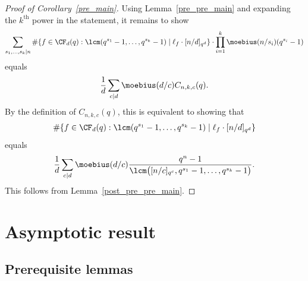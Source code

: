 \begin{proof}[Proof of Corollary~\ref{pre_main}]
Using Lemma~\ref{pre_pre_main} and expanding the \(k^\text{th}\) power in the statement, it remains to show
\[
\sum_{s_1,\ldots,s_k \mid n}
\# \{f \in \CF_d (q) : \lcm(q^{s_1}-1,\ldots,q^{s_k}-1) \mid \ell_f \cdot [n/d]_{q^d}\}
\cdot
\prod_{i=1}^k \moebius(n/s_i)(q^{s_i}-1)
\]
equals
\[
\frac{1}{d} \sum_{c \mid d} \moebius(d/c) C_{n,k,c} (q).
\]
By the definition of \(C_{n,k,c} (q)\),
this is equivalent to showing that
\[
\# \{f \in \CF_d (q) : \lcm(q^{s_1}-1,\ldots,q^{s_k}-1) \mid \ell_f \cdot [n/d]_{q^d} \}
\]
equals
\[
\frac{1}{d}
\sum_{c \mid d}
\moebius(d/c)
\frac{q^n-1}{\lcm \big ( [n/c]_{q^c}, q^{s_1}-1, \ldots, q^{s_k}-1 \big )}.
\]
This follows from Lemma~\ref{post_pre_pre_main}.
\end{proof}






































\section{Asymptotic result}
\label{probabilistic_section}








\subsection{Prerequisite lemmas}


